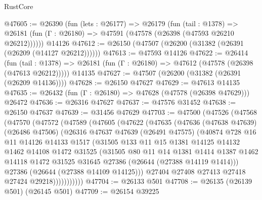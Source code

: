 \begin{lexlean}{RustCore}
\begin{coremodule}
@47605 := @26390
    (fun (lets : @26177) =>
    @26179
      (fun (tail : @1378) =>
      @26181 (fun (Γ : @26180) => @47591 (@47578 (@26398 (@47593 @26210 @26212))))))
    @14126
@47612 := @26150 (@47507 (@26200 (@31382 (@26391 (@26209 (@14127 @26212))))))
@47613 := @47593 @14126
@47622 := @26414
    (fun (tail : @1378) => @26181 (fun (Γ : @26180) => @47612 (@47578 (@26398 (@47613 @26212)))))
    @14135
@47627 := @47507 (@26200 (@31382 (@26391 (@26209 @14136))))
@47628 := @26150 @47627
@47629 := @47613 @14135
@47635 := @26432 (fun (Γ : @26180) => @47628 (@47578 (@26398 @47629))) @26472
@47636 := @26316 @47627
@47637 := @47576 @31452
@47638 := @26150 @47637
@47639 := @31456 @47629
@47703 := @47500
    (@47526
      (@47568
        (@47570
          (@47572
            (@47589
              (@47605
                (@47622
                  (@47635
                    (@47636
                      (@47638 @47639)
                      (@26486 @47506)
                      (@26316
                        @47637
                        @47639
                        (@26491 @47575)
                        (@40874
                          @728
                          @16
                          @11
                          @14126
                          @14133
                          @1517
                          (@31505
                            @133
                            @11
                            @15
                            @1381
                            @14125
                            @14132
                            @1462
                            @14108
                            @1472
                            @31525
                            (@31505
                              @80
                              @11
                              @14
                              @1381
                              @1414
                              @1387
                              @1462
                              @14118
                              @1472
                              @31525
                              @31645
                              @27386
                              (@26644 (@27388 @14119 @1414)))
                            @27386
                            (@26644 (@27388 @14109 @14125)))
                          @27404
                          @27408
                          @27413
                          @27418
                          @27424
                          @29218)))))))))))
@47704 := @26133 @501
@47708 := @26135 (@26139 @501) (@26145 @501)
@47709 := @26154 @39225

\end{coremodule}
\end{lexlean}
